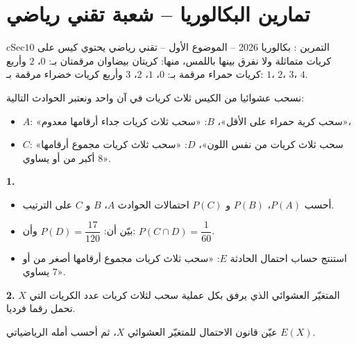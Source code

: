 \documentclass[12pt,a4paper]{article}
\newenvironment{BOX}[2]{\begin{otherlanguage}{english}\begin{arbox}{#1}{#2}}{\end{arbox}\end{otherlanguage}}
\newcounter{exo}
\newenvironment{tamrin}[1]{\stepcounter{exo}\begin{BOX}{cSec}{التمرين \theexo: #1}}{\end{BOX}}
\newenvironment{sq}{\begin{itemize}[leftmargin=2.4em,itemsep=3pt]}{\end{itemize}}
\newcommand{\qa}{\item[(أ)]}\newcommand{\qb}{\item[(ب)]}\newcommand{\qc}{\item[(جـ)]}\newcommand{\qd}{\item[(د)]}\newcommand{\qe}{\item[(هـ)]}
\newcommand{\QQ}[1]{\par\smallskip\textbf{#1.} }
\begin{document}
\section{تمارين البكالوريا -- شعبة تقني رياضي}

\begin{tamrin}{بكالوريا 2026 -- الموضوع الأول -- تقني رياضي}
يحتوي كيس على $10$ كريات متماثلة ولا نفرق بينها باللمس، منها: كريتان بيضاوان مرقمتان بـ: $0$، $2$ وأربع كريات حمراء مرقمة بـ: $0$، $1$، $2$، $3$ وأربع كريات خضراء مرقمة بـ: $1$، $2$، $3$، $4$.

نسحب عشوائيا من الكيس ثلاث كريات في آن واحد ونعتبر الحوادث التالية:
\begin{itemize}
\item $A$: «سحب كرية حمراء على الأقل»، \quad $B$: «سحب ثلاث كريات جداء أرقامها معدوم»،
\item $C$: «سحب ثلاث كريات من نفس اللون»، \quad $D$: «سحب ثلاث كريات مجموع أرقامها أكبر من أو يساوي $8$».
\end{itemize}
\QQ{1}
\begin{sq}
\qa أحسب $P(A)$، $P(B)$ و $P(C)$ احتمالات الحوادث $A$، $B$ و $C$ على الترتيب.
\qb بيّن أن: $P(D)=\dfrac{17}{120}$ وأن: $P(C\cap D)=\dfrac{1}{60}$.
\qc استنتج حساب احتمال الحادثة $E$: «سحب ثلاث كريات مجموع أرقامها أصغر من أو يساوي $7$».
\end{sq}
\QQ{2} $X$ المتغيّر العشوائي الذي يرفق بكل عملية سحب لثلاث كريات عدد الكريات التي تحمل رقما فرديا.

عيّن قانون الاحتمال للمتغيّر العشوائي $X$، ثم أحسب أمله الرياضياتي $E(X)$.
\end{tamrin}
\end{document}

